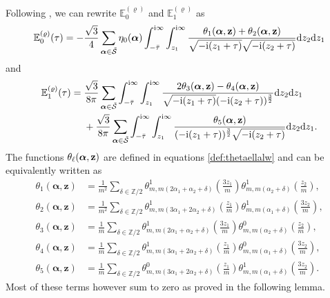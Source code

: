 \documentclass[10pt,a4paper]{amsart}
\def\BE{\mathbb{E}}
\def\CS{\mathcal{S}}
\newcommand{\ZZ}{\mathbb{Z}}
\def\bos{\varrho}
\def\al{\alpha}
\def\bal{\boldsymbol{\alpha}}
\theoremstyle{definition}
\numberwithin{equation}{section}
\begin{document}
Following \cite{bringmann2018higher}, we can rewrite $\mathbb{E}^{(\bos)}_{0}$ and $\mathbb{E}^{(\bos)}_{1}$ as
\[%
	\BE_0^{(\bos)}(\tau) =
 -\frac{\sqrt{3}}{4} \sum_{\boldsymbol{\alpha} \in \tilde{\CS}}
	\eta_0(\boldsymbol{\alpha})
	\int_{-\bar{\tau}}^{{\rm i} \infty}\int_{z_1}^{{\rm i} \infty}
	\frac{\theta_1({\boldsymbol\alpha},
	{\bf z})+\theta_2({\boldsymbol\alpha},
	{\bf z})}{\sqrt{-{\rm i}(z_1+\tau)}\sqrt{-{\rm i}(z_2+\tau)}}{\rm d}z_2{\rm d}z_1
\]
and
\begin{align*}%
\BE_1^{(\bos)}(\tau) ={}&\frac{\sqrt{3}}{8 \pi}
\sum_{\boldsymbol{\alpha} \in \tilde{\CS}}
\int_{-\bar{\tau}}^{{\rm i} \infty}
\int_{z_1}^{{\rm i} \infty}\frac{2\theta_3({\bal}, {\bf z})-
\theta_4({\bal},
{\bf z})}{\sqrt{-{\rm i}(z_1+\tau)}(-{\rm i}(z_2+\tau))^{\frac{3}{2}}}
{\rm d}z_2{\rm d}z_1 \\
 &+\frac{\sqrt{3}}{8 \pi}\sum_{\boldsymbol{\alpha} \in \tilde{\CS}}
\int_{-\bar{\tau}}^{{\rm i} \infty}
\int_{z_1}^{{\rm i} \infty}\frac{\theta_5({\bal},
{\bf z})}{(-{\rm i}(z_1+\tau))^{\frac{3}{2}}\sqrt{-{\rm i}(z_2+\tau)}} {\rm d}z_2{\rm d}z_1 .
\end{align*}
The functions $\theta_\ell({\bal}, {\bf z})$ are defined in equations \eqref{def:thetaellalw} and can be equivalently written as
\begin{align*}%
\theta_1(\bal,\mathbf{z}) &=
\frac{1}{m^2} \sum_{\delta\in\ZZ/2}
\theta^1_{m,m(2\al_1+\al_2+\delta)}\left(\frac{3z_1}{m}\right)
\theta^1_{m,m(\al_2+\delta)}\left(\frac{z_2}{m}\right),
\\
\theta_2(\bal,\mathbf{z}) &=
\frac{1}{m^2} \sum_{\delta\in\ZZ/2}
\theta^1_{m,m(3\al_1+2\al_2+\delta)}\left(\frac{z_1}{m}\right)
\theta^1_{m,m(\al_1+\delta)}\left(\frac{3z_2}{m}\right),
\\
\theta_3 (\bal,\mathbf{z}) &=
\frac{1}{m} \sum_{\delta\in\ZZ/2}
\theta^1_{m,m(2\al_1+\al_2+\delta)}\left(\frac{3z_1}{m}\right)
\theta^0_{m,m(\al_2+\delta)}\left(\frac{z_2}{m}\right),
\\
\theta_4 (\bal,\mathbf{z}) &=
\frac{1}{m} \sum_{\delta\in\ZZ/2}
\theta^1_{m,m(3\al_1+2\al_2+\delta)}\left(\frac{z_1}{m}\right)
\theta^0_{m,m(\al_1+\delta)}\left(\frac{3z_2}{m}\right),
\\
\theta_5 (\bal,\mathbf{z}) &=
\frac{1}{m} \sum_{\delta\in\ZZ/2}
\theta^0_{m,m(3\al_1+2\al_2+\delta)}\left(\frac{z_1}{m}\right)
\theta^1_{m,m(\al_1+\delta)}\left(\frac{3z_2}{m}\right).
\end{align*}
Most of these terms however sum to zero as proved in the following lemma.
\end{document}
